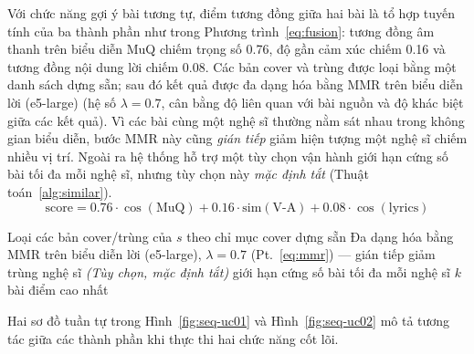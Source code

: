 \documentclass[../DoAn.tex]{subfiles}
\begin{document}
Với chức năng gợi ý bài tương tự, điểm tương đồng giữa hai bài là tổ hợp tuyến tính của ba thành phần như trong Phương trình~\eqref{eq:fusion}: tương đồng âm thanh trên biểu diễn MuQ chiếm trọng số 0.76, độ gần cảm xúc chiếm 0.16 và tương đồng nội dung lời chiếm 0.08. Các bản cover và trùng được loại bằng một danh sách dựng sẵn; sau đó kết quả được đa dạng hóa bằng MMR \cite{carbonell1998mmr} trên biểu diễn lời (e5-large) (hệ số $\lambda = 0.7$, cân bằng độ liên quan với bài nguồn và độ khác biệt giữa các kết quả). Vì các bài cùng một nghệ sĩ thường nằm sát nhau trong không gian biểu diễn, bước MMR này cũng \textit{gián tiếp} giảm hiện tượng một nghệ sĩ chiếm nhiều vị trí. Ngoài ra hệ thống hỗ trợ một tùy chọn vận hành giới hạn cứng số bài tối đa mỗi nghệ sĩ, nhưng tùy chọn này \textit{mặc định tắt} (Thuật toán~\ref{alg:similar}).
\begin{equation}\label{eq:fusion}
    \text{score} = 0.76 \cdot \cos(\text{MuQ}) + 0.16 \cdot \text{sim}(\text{V-A}) + 0.08 \cdot \cos(\text{lyrics})
\end{equation}

\begin{algorithm}[H]
\caption{Gợi ý bài hát tương tự}
\label{alg:similar}
Loại các bản cover/trùng của $s$ theo chỉ mục cover dựng sẵn\;
Đa dạng hóa bằng MMR trên biểu diễn lời (e5-large), $\lambda = 0.7$ (Pt.~\eqref{eq:mmr}) --- gián tiếp giảm trùng nghệ sĩ\;
\textit{(Tùy chọn, mặc định tắt)} giới hạn cứng số bài tối đa mỗi nghệ sĩ\;
\Return $k$ bài điểm cao nhất\;
\end{algorithm}

Hai sơ đồ tuần tự trong Hình~\ref{fig:seq-uc01} và Hình~\ref{fig:seq-uc02} mô tả tương tác giữa các thành phần khi thực thi hai chức năng cốt lõi.
\end{document}
